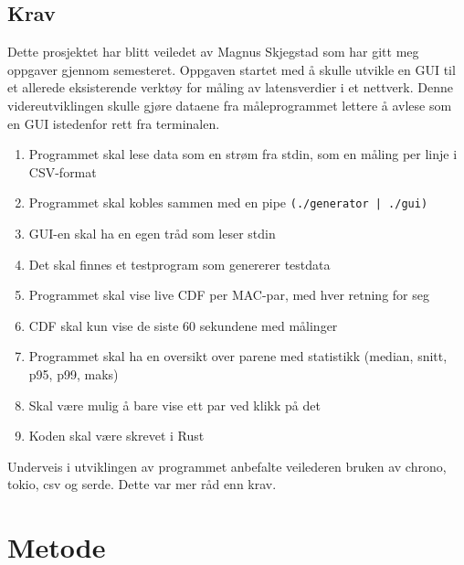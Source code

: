\documentclass[norsk]{uiobachelorthesis}
\begin{document}
\subsection{Krav}
\label{sec:krav}
Dette prosjektet har blitt veiledet av Magnus Skjegstad som har gitt meg oppgaver gjennom semesteret. Oppgaven startet med å skulle utvikle en GUI til et allerede eksisterende verktøy for måling av latensverdier i et nettverk. Denne videreutviklingen skulle gjøre dataene fra måleprogrammet lettere å avlese som en GUI istedenfor rett fra terminalen.  
\begin{enumerate}[label=K\arabic*]
  \item \label{krav:stdin} Programmet skal lese data som en strøm fra stdin, som en måling per linje i CSV-format
  \item \label{krav:pipe} Programmet skal kobles sammen med en pipe \texttt{(./generator | ./gui)}
  \item \label{krav:trad} GUI-en skal ha en egen tråd som leser stdin 
  \item \label{krav:testprogram} Det skal finnes et testprogram som genererer testdata
  \item \label{krav:cdf} Programmet skal vise live CDF per MAC-par, med hver retning for seg
  \item \label{krav:sek} CDF skal kun vise de siste 60 sekundene med målinger
  \item \label{krav:statistikk} Programmet skal ha en oversikt over parene med statistikk (median, snitt, p95, p99, maks)
  \item \label{krav:klikkforvise} Skal være mulig å bare vise ett par ved klikk på det
  \item \label{krav:rust} Koden skal være skrevet i Rust
\end{enumerate}

Underveis i utviklingen av programmet anbefalte veilederen bruken av chrono, tokio, csv og serde. Dette var mer råd enn krav.

\section{Metode}
\label{sec:metode}
\end{document}
